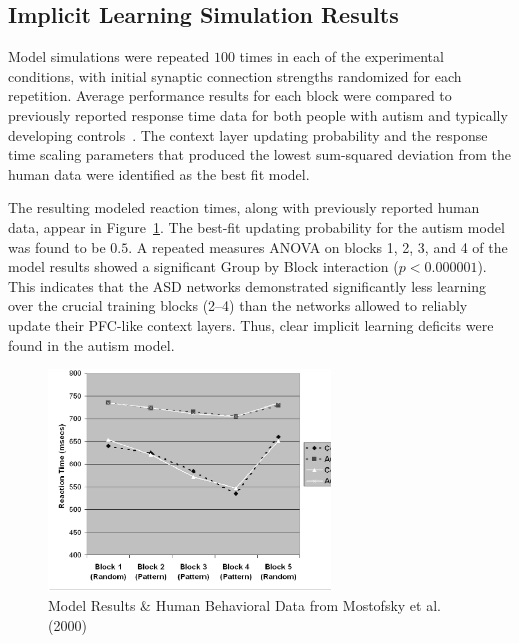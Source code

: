 \subsection{Implicit Learning Simulation Results}
Model simulations were repeated $100$ times in each of the experimental conditions, with initial synaptic connection strengths randomized for each repetition. Average performance results for each block were compared to previously reported response time data for both people with autism and typically developing controls~\cite{MostofskySH:2000:Procedural}. The context layer updating probability and the response time scaling parameters that produced the lowest sum-squared deviation from the human data were identified as the best fit model.

The resulting modeled reaction times, along with previously reported human data, appear in Figure~\ref{Model-Results}. The best-fit updating probability for the autism model was found to be $0.5$. A repeated measures ANOVA on blocks 1, 2, 3, and 4 of the model results showed a significant Group by Block interaction ($p < 0.000001$). This indicates that the ASD networks demonstrated significantly less learning over the crucial training blocks (2--4) than the networks allowed to reliably update their PFC-like context layers. Thus, clear implicit learning deficits were found in the autism model.


\begin{figure}[t]
\begin{center}
	\includegraphics[width=75mm]{figures/srtt_chart.ps}
\end{center}
\caption{Model Results \& Human Behavioral Data from Mostofsky
         et al. (2000)} 
\label{Model-Results}
\end{figure} 

